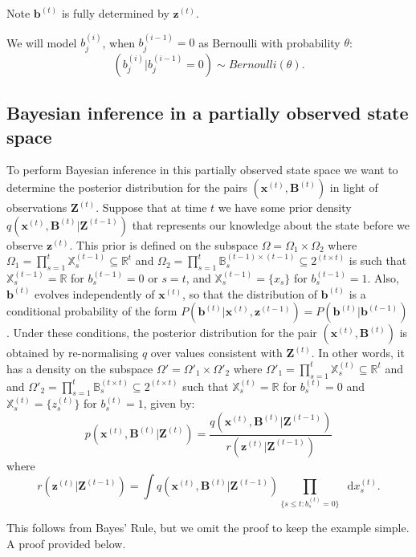 \documentclass[11pt,a4paper]{article}
\renewcommand{\vec}[1]{\mathbf{#1}}
\newcommand*\diff{\mathop{}\!\mathrm{d}}
\begin{document}
Note $\vec{b}^{(t)}$ is fully determined by $\vec{z}^{(t)}$.

We will model $b_j^{(i)}$, when $b_j^{(i-1)} = 0$ as Bernoulli with probability $\theta$:
\[
(b_j^{(i)} | b_j^{(i-1)} = 0) \sim Bernoulli(\theta).
\]


\subsection{Bayesian inference in a partially observed state space}

To perform Bayesian inference in this partially observed state space we want to determine the posterior distribution for the pairs $(\vec{x}^{(t)}, \vec{B}^{(t)})$ in light of observations $\vec{Z}^{(t)}$. Suppose that at time $t$ we have some prior density $q(\vec{x}^{(t)},\vec{B}^{(t)} | \vec{Z}^{(t-1)})$ that represents our knowledge about the state before we observe $\vec{z}^{(t)}$. This prior is defined on the subspace $\Omega = \Omega_1 \times \Omega_2$ where $\Omega_1 = \prod_{s=1}^t \mathbb{X}_s^{(t-1)} \subseteq \mathbb{R}^t$ and $\Omega_2 = \prod_{s=1}^t \mathbb{B}_s^{(t-1) \times (t-1)} \subseteq 2^{(t \times t)}$ is such that $\mathbb{X}_s^{(t-1)} = \mathbb{R}$ for $b_s^{(t-1)} = 0$ or $s=t$, and $\mathbb{X}_s^{(t-1)} = \{ x_s \}$ for $b_s^{(t-1)} = 1$. Also, $\vec{b}^{(t)}$ evolves independently of $\vec{x}^{(t)}$, so that the distribution of $\vec{b}^{(t)}$ is a conditional probability of the form $P(\vec{b}^{(t)} | \vec{x}^{(t)}, \vec{z}^{(t-1)} ) = P( \vec{b}^{(t)} | \vec{b}^{(t-1)} )$. Under these conditions, the posterior distribution for the pair $(\vec{x}^{(t)}, \vec{B}^{(t)})$ is obtained by re-normalising $q$ over values consistent with $\vec{Z}^{(t)}$. In other words, it has a density on the subspace $\Omega' = \Omega'_1 \times \Omega'_2$ where $\Omega'_1 = \prod_{s=1}^t \mathbb{X}_s^{(t)} \subseteq \mathbb{R}^t$ and and $\Omega'_2 = \prod_{s=1}^t \mathbb{B}_s^{(t \times t)} \subseteq 2^{(t \times t)}$ such that $\mathbb{X}_s^{(t)} = \mathbb{R}$ for $b_s^{(t)} = 0$ and $\mathbb{X}_s^{(t)} = \{ z_s^{(t)}\}$ for $b_s^{(t)} = 1$, given by:
\[
p(\vec{x}^{(t)}, \vec{B}^{(t)} | \vec{Z}^{(t)})  =   
\frac{ q(\vec{x}^{(t)}, \vec{B}^{(t)}|\vec{Z}^{(t-1)})} {r(\vec{z}^{(t)} | \vec{Z}^{(t-1)})}
\]
where 
\[
r(\vec{z}^{(t)} | \vec{Z}^{(t-1)}) = \int q(\vec{x}^{(t)}, \vec{B}^{(t)}|\vec{Z}^{(t-1)}) \prod_{\{s \leq t: b_s^{(t)} = 0\}} \diff x_s^{(t)}.
\]

This follows from Bayes' Rule, but we omit the proof to keep the example simple. A proof provided below.
\end{document}
